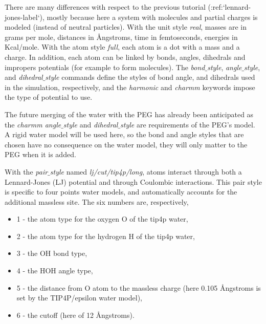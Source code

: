 \noindent There are many differences with respect to
the previous tutorial (:ref:`lennard-jones-label`), mostly
because here a system with molecules and partial charges is
modeled (instead of neutral particles). With the unit style \textit{real},
masses are in grams per
mole, distances in Ångstroms, time in femtoseconds, energies
in Kcal/mole. With the atom style \textit{full}, each atom is a dot
with a mass and a charge. In addition, each atom can be
linked by bonds, angles, dihedrals and impropers potentials
(for example to form molecules). The \textit{bond$\_$style},
\textit{angle$\_$style}, and \textit{dihedral$\_$style} commands define the
styles of bond angle, and dihedrals used in the simulation,
respectively, and the \textit{harmonic} and \textit{charmm} keywords
impose the type of potential to use.

\begin{tcolorbox}[colback=mylightblue!5!white,colframe=mylightblue!75!black,title=About the use of charmm style]
The future merging of the water with the PEG
has already been anticipated as the \textit{charmm angle$\_$style}
and \textit{dihedral$\_$style} are requirements of the PEG's model.
A rigid water model will be used here, so the bond
and angle styles that are chosen have no consequence on the water model, they will
only matter to the PEG when it is added.
\end{tcolorbox}

\noindent With the \textit{pair$\_$style} named \textit{lj/cut/tip4p/long}, atoms
interact through both a Lennard-Jones (LJ) potential and
through Coulombic interactions. This pair style is specific to
four points water models, and automatically accounts for the
additional massless site. The six numbers are, respectively,
\begin{itemize}
\item  \textit{}1 -\textit{} the atom type for the oxygen O of the tip4p water,
\item  \textit{}2 -\textit{} the atom type for the hydrogen H of the tip4p water,
\item  \textit{}3 -\textit{} the OH bond type,
\item  \textit{}4 -\textit{} the HOH angle type,
\item  \textit{}5 -\textit{} the distance from O atom to the massless charge (here 0.105 Ångstroms is set by the TIP4P/epsilon water model),
\item  \textit{}6 -\textit{} the cutoff (here of 12 Ångstroms).
\end{itemize}

